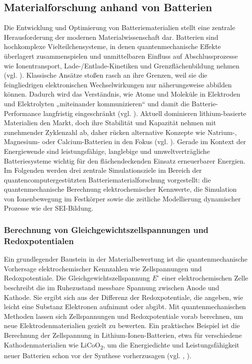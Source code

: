 \subsection{Materialforschung anhand von Batterien}
\label{Chemie_Materialforschung_Batterien}

Die Entwicklung und Optimierung von Batteriematerialien stellt eine zentrale Herausforderung der modernen Materialwissenschaft dar. Batterien sind hochkomplexe Vielteilchensysteme, in denen quantenmechanische Effekte überlagert zusammenspielen und unmittelbaren Einfluss auf Abschlussprozesse wie Ionentransport, Lade-/Entlade-Kinetiken und Grenzflächenbildung nehmen (vgl. \cite{bauer_quantum_2020}). Klassische Ansätze stoßen rasch an ihre Grenzen, weil sie die feingliedrigen elektronischen Wechselwirkungen nur näherungsweise abbilden können. Dadurch wird das Verständnis, wie Atome und Moleküle in Elektroden und Elektrolyten „miteinander kommunizieren“ und damit die Batterie-Performance langfristig eingeschränkt (vgl. \cite{demirApplicationQuantumComputing2024}).
Aktuell dominieren lithium-basierte Materialien den Markt, doch ihre Stabilität und Kapazität nehmen mit zunehmender Zyklenzahl ab, daher rücken alternative Konzepte wie Natrium-, Magnesium- oder Calcium-Batterien in den Fokus (vgl. \cite{demirApplicationQuantumComputing2024}). Gerade im Kontext der Energiewende sind leistungsfähige, langlebige und umweltverträgliche Batteriesysteme wichtig für den flächendeckenden Einsatz erneuerbarer Energien. 
\newline\\
Im Folgenden werden drei zentrale Simulationsziele im Bereich der quantencomputergestützten Batteriematerialforschung vorgestellt: die quantenmechanische Berechnung elektrochemischer Kennwerte, die Simulation von Ionenbewegung im Festkörper sowie die zeitliche Modellierung dynamischer Prozesse wie der SEI-Bildung.

\subsubsection{Berechnung von Gleichgewichtszellspannungen und Redoxpotentialen}

Ein grundlegender Baustein in der Materialbewertung ist die quantenmechanische Vorhersage elektrochemischer Kennzahlen wie Zellspannungen und Redoxpotentiale. Die Gleichgewichtszellspannung $E^\circ$
einer elektrochemischen Zelle beschreibt die im Ruhezustand messbare Spannung zwischen Anode und Kathode. Sie ergibt sich aus der Differenz der Redoxpotentiale, die angeben, wie leicht eine Substanz Elektronen aufnimmt oder abgibt. Mit quantenmechanischen Methoden lassen sich Zellspannungen und Redoxpotentiale vorab berechnen, um neue Elektrodenmaterialien gezielt zu bewerten. Ein praktisches Beispiel ist die Berechnung der Zellspannung in Lithium-Ionen-Batterien, etwa für verschiedene Kathodenmaterialien wie LiCoO\textsubscript{2}, um die Energiedichte und Leistungsfähigkeit neuer Batterien schon vor der Synthese vorherzusagen (vgl. \cite{urban_computational_2016}, \cite{hanaor_computational_2024}).

